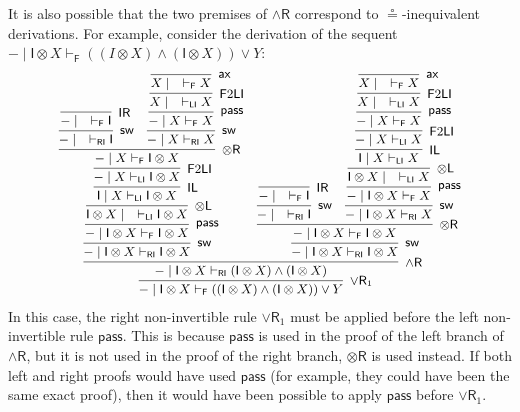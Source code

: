 \documentclass[submission,copyright,creativecommons]{eptcs}
\theoremstyle{definition}
\newcommand{\tl}{\otimes \mathsf{L}}
\newcommand{\tr}{\otimes \mathsf{R}}
\newcommand{\pass}{\mathsf{pass}}
\newcommand{\unitl}{\mathsf{IL}}
\newcommand{\unitr}{\mathsf{IR}}
\newcommand{\andr}{\land \mathsf{R}}
\newcommand{\orrone}{\lor \mathsf{R}_{1}}
\newcommand{\ax}{\mathsf{ax}}
\newcommand{\ot}{\otimes}
\newcommand{\I}{\mathsf{I}}
\newcommand{\RI}{\mathsf{RI}}
\newcommand{\LI}{\mathsf{LI}}
\newcommand{\F}{\mathsf{F}}
\newcommand{\sw}{\mathsf{sw}}
\newcommand\niccolo[1]{\mbox{}
{\marginpar{\color{red}NV}}
{\sf\noindent\color{red}#1}}%
\begin{document}
It is also possible that the two premises of $\andr$ correspond to $\circeq$-inequivalent derivations.
For example, consider the derivation of the sequent $- \mid \I \ot X \vdash_\F ((I \ot X) \land (\I \ot X)) \lor Y$: %
\begin{equation*}\small
  \begin{array}{c}
    \infer[\orrone]{- \mid \I \ot X \vdash_\F ((\I \ot X) \land (\I \ot X)) \lor Y}{
      \infer[\andr]{- \mid \I \ot X \vdash_\RI (\I \ot X) \land (\I \ot X)}{
        \infer[\sw]{- \mid \I \ot X \vdash_\RI \I \ot X}{
        \infer[\pass]{- \mid \I \ot X \vdash_\F \I \ot X}{
          \infer[\tl]{\I \ot X \mid \quad \vdash_\LI \I \ot X}{
          \infer[\unitl]{\I \mid X \vdash_\LI \I \ot X}{
            \infer[\F 2 \LI]{- \mid X \vdash_\LI \I \ot X}{
            \infer[\tr]{- \mid X \vdash_\F \I \ot X}{
                \infer[\sw]{- \mid \quad \vdash_\RI \I}{
                \infer[\unitr]{- \mid \quad \vdash_\F \I}{}
              }
              &
              \infer[\sw]{- \mid X \vdash_\RI X}{
              \infer[\pass]{- \mid X \vdash_\F X}{
                \infer[\F 2 \LI]{X \mid \quad \vdash_\LI X}{
                \infer[\ax]{X \mid \quad \vdash_\F X}{}
              }
            }
          }
        }
        }}}}}
        &
        \infer[\sw]{- \mid \I \ot X \vdash_\RI \I \ot X}{
        \infer[\tr]{- \mid \I \ot X \vdash_\F \I \ot X}{
          \infer[\sw]{- \mid \quad \vdash_\RI \I}{
            \infer[\unitr]{- \mid \quad \vdash_\F \I}{}
            }
          &
          \infer[\sw]{- \mid \I \ot X \vdash_\RI X}{
          \infer[\pass]{- \mid \I \ot X \vdash_\F X}{
            \infer[\tl]{\I \ot X \mid \quad \vdash_\LI X}{
              \infer[\unitl]{\I \mid X \vdash_\LI X}{
                \infer[\F 2 \LI]{- \mid X \vdash_\LI X}{
                \infer[\pass]{- \mid X \vdash_\F X}{
                  \infer[\F 2 \LI]{X \mid \quad \vdash_\LI X}{
                  \infer[\ax]{X \mid \quad \vdash_\F X}{}
                }
              }
            }
          }
        }
      }
    }}}}}
  \end{array}
\end{equation*}
In this case, %
the right non-invertible rule $\orrone$ must be applied before the left non-invertible rule $\pass$. This is because $\pass$ is used in the proof of the left branch of $\andr$, but it is not used in the proof of the right branch, $\tr$ is used instead. If both left and right proofs would have used $\pass$ (for example, they could have been the same exact proof), then it would have been possible to apply $\pass$ before $\orrone$.
\end{document}
